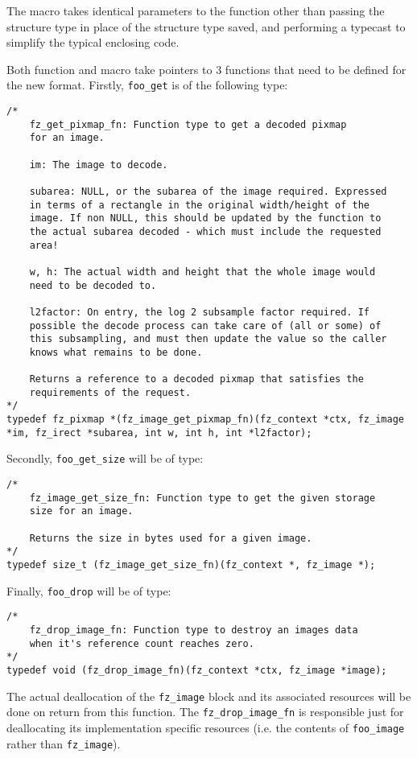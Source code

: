\documentclass[oneside]{book}
\begin{document}
The macro takes identical parameters to the function other than passing the structure type in place of the structure type saved, and performing a typecast to simplify the typical enclosing code.

Both function and macro take pointers to 3 functions that need to be defined for the new format. Firstly, \texttt{foo\_get} is of the following type:

\begin{lstlisting}
/*
	fz_get_pixmap_fn: Function type to get a decoded pixmap
	for an image.

	im: The image to decode.

	subarea: NULL, or the subarea of the image required. Expressed
	in terms of a rectangle in the original width/height of the
	image. If non NULL, this should be updated by the function to
	the actual subarea decoded - which must include the requested
	area!

	w, h: The actual width and height that the whole image would
	need to be decoded to.

	l2factor: On entry, the log 2 subsample factor required. If
	possible the decode process can take care of (all or some) of
	this subsampling, and must then update the value so the caller
	knows what remains to be done.

	Returns a reference to a decoded pixmap that satisfies the
	requirements of the request.
*/
typedef fz_pixmap *(fz_image_get_pixmap_fn)(fz_context *ctx, fz_image *im, fz_irect *subarea, int w, int h, int *l2factor);
\end{lstlisting}

Secondly, \texttt{foo\_get\_size} will be of type:

\begin{lstlisting}
/*
	fz_image_get_size_fn: Function type to get the given storage
	size for an image.

	Returns the size in bytes used for a given image.
*/
typedef size_t (fz_image_get_size_fn)(fz_context *, fz_image *);
\end{lstlisting}

Finally, \texttt{foo\_drop} will be of type:

\begin{lstlisting}
/*
	fz_drop_image_fn: Function type to destroy an images data
	when it's reference count reaches zero.
*/
typedef void (fz_drop_image_fn)(fz_context *ctx, fz_image *image);
\end{lstlisting}

The actual deallocation of the \texttt{fz\_image} block and its associated resources will be done on return from this function. The \texttt{fz\_drop\_image\_fn} is responsible just for deallocating its implementation specific resources (i.e. the contents of \texttt{foo\_image} rather than \texttt{fz\_image}).
\end{document}
